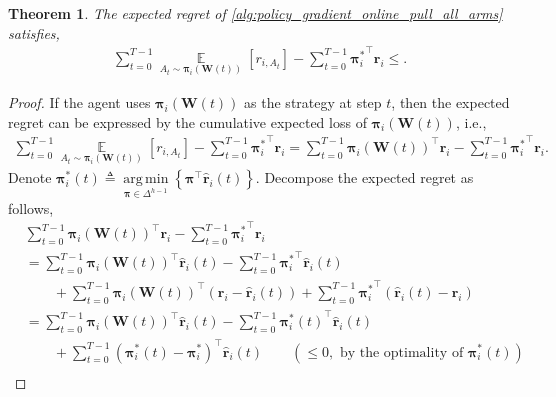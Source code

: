 \documentclass[10pt]{article}
\def\rvr{{\mathbf{r}}}
\newtheorem{thm}{Theorem}
\def\rvpi{{\boldsymbol{\pi}}}
\def\rmW{{\mathbf{W}}}
\def\sE{{\mathbb{E}}}
\DeclareMathOperator*{\argmin}{arg\,min}
\DeclareMathOperator*{\expectation}{\sE}
\begin{document}
\begin{thm}
\label{thm:sublinear_online_update_pull_all_arms}
    The expected regret of \cref{alg:policy_gradient_online_pull_all_arms} satisfies,
\begin{equation*}
\begin{split}
    \sum\limits_{t=0}^{T-1}{ \expectation\limits_{A_t \sim \rvpi_i\left(\rmW(t)\right)} \left[ r_{i, A_t} \right] } - \sum\limits_{t=0}^{T-1}{ {\rvpi_i^*}^\top \rvr_i } \le .
\end{split}
\end{equation*}
\end{thm}
\begin{proof}
    If the agent uses $\rvpi_{i}\left(\rmW(t)\right)$ as the strategy at step $t$, then the expected regret can be expressed by the cumulative expected loss of $\rvpi_{i}\left(\rmW(t)\right)$, i.e.,
\begin{equation*}
\begin{split}
    \sum\limits_{t=0}^{T-1}{ \expectation\limits_{A_t \sim \rvpi_i\left(\rmW(t)\right)} \left[ r_{i, A_t} \right] } - \sum\limits_{t=0}^{T-1}{ {\rvpi_i^*}^\top \rvr_i } = \sum\limits_{t=0}^{T-1}{\rvpi_i\left(\rmW(t)\right)^\top \rvr_i} - \sum\limits_{t=0}^{T-1}{ {\rvpi_i^*}^\top \rvr_i }.
\end{split}
\end{equation*}
    Denote ${\rvpi_i^*(t)} \triangleq \argmin\limits_{\rvpi \in \Delta^{h-1}}{ \left\{ \rvpi^\top \hat{\rvr}_i(t) \right\} }$. Decompose the expected regret as follows,
\begin{equation}
\label{eq:cumulative_expected_loss_decomposition}
\begin{split}
    &\sum\limits_{t=0}^{T-1}{\rvpi_i\left(\rmW(t)\right)^\top \rvr_i} - \sum\limits_{t=0}^{T-1}{ {\rvpi_i^*}^\top \rvr_i } \\
    &= \sum\limits_{t=0}^{T-1}{ \rvpi_i\left(\rmW(t)\right)^\top \hat{\rvr}_i(t)} - \sum\limits_{t=0}^{T-1}{ {\rvpi_i^*}^\top \hat{\rvr}_i(t)} \\
    &\qquad + \sum\limits_{t=0}^{T-1}{ \rvpi_i\left(\rmW(t)\right)^\top \left( \rvr_i - \hat{\rvr}_i(t) \right) } + \sum\limits_{t=0}^{T-1}{ {\rvpi_i^*}^\top \left( \hat{\rvr}_i(t) - \rvr_i \right) } \\
    &= \sum\limits_{t=0}^{T-1}{ \rvpi_i\left(\rmW(t)\right)^\top \hat{\rvr}_i(t)} - \sum\limits_{t=0}^{T-1}{ {\rvpi_i^*(t)}^\top \hat{\rvr}_i(t)} \\
    &\qquad + \sum\limits_{t=0}^{T-1}{ \left( {\rvpi_i^*(t)} - {\rvpi_i^*} \right)^\top \hat{\rvr}_i(t) } \qquad \left( \le 0, \text{ by the optimality of } {\rvpi_i^*(t)} \right) \\

\end{split}
\end{equation}
\end{proof}
\end{document}
